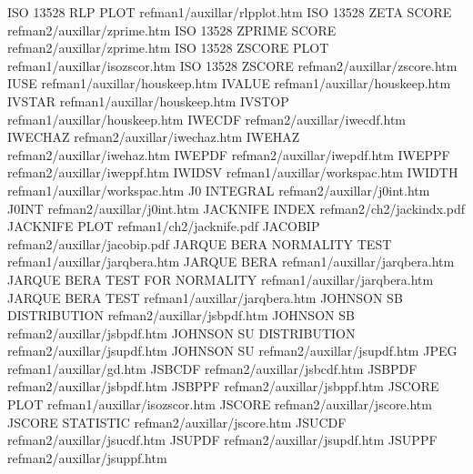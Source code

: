 ISO 13528 RLP PLOT                      refman1/auxillar/rlpplot.htm
ISO 13528 ZETA SCORE                    refman2/auxillar/zprime.htm
ISO 13528 ZPRIME SCORE                  refman2/auxillar/zprime.htm
ISO 13528 ZSCORE PLOT                   refman1/auxillar/isozscor.htm
ISO 13528 ZSCORE                        refman2/auxillar/zscore.htm
IUSE                                    refman1/auxillar/houskeep.htm
IVALUE                                  refman1/auxillar/houskeep.htm
IVSTAR                                  refman1/auxillar/houskeep.htm
IVSTOP                                  refman1/auxillar/houskeep.htm
IWECDF                                  refman2/auxillar/iwecdf.htm
IWECHAZ                                 refman2/auxillar/iwechaz.htm
IWEHAZ                                  refman2/auxillar/iwehaz.htm
IWEPDF                                  refman2/auxillar/iwepdf.htm
IWEPPF                                  refman2/auxillar/iweppf.htm
IWIDSV                                  refman1/auxillar/workspac.htm
IWIDTH                                  refman1/auxillar/workspac.htm
J0 INTEGRAL                             refman2/auxillar/j0int.htm
J0INT                                   refman2/auxillar/j0int.htm
JACKNIFE INDEX                          refman2/ch2/jackindx.pdf
JACKNIFE PLOT                           refman1/ch2/jacknife.pdf
JACOBIP                                 refman2/auxillar/jacobip.pdf
JARQUE BERA NORMALITY TEST              refman1/auxillar/jarqbera.htm
JARQUE BERA                             refman1/auxillar/jarqbera.htm
JARQUE BERA TEST FOR NORMALITY          refman1/auxillar/jarqbera.htm
JARQUE BERA TEST                        refman1/auxillar/jarqbera.htm
JOHNSON SB DISTRIBUTION                 refman2/auxillar/jsbpdf.htm
JOHNSON SB                              refman2/auxillar/jsbpdf.htm
JOHNSON SU DISTRIBUTION                 refman2/auxillar/jsupdf.htm
JOHNSON SU                              refman2/auxillar/jsupdf.htm
JPEG                                    refman1/auxillar/gd.htm
JSBCDF                                  refman2/auxillar/jsbcdf.htm
JSBPDF                                  refman2/auxillar/jsbpdf.htm
JSBPPF                                  refman2/auxillar/jsbppf.htm
JSCORE PLOT                             refman1/auxillar/isozscor.htm
JSCORE                                  refman2/auxillar/jscore.htm
JSCORE STATISTIC                        refman2/auxillar/jscore.htm
JSUCDF                                  refman2/auxillar/jsucdf.htm
JSUPDF                                  refman2/auxillar/jsupdf.htm
JSUPPF                                  refman2/auxillar/jsuppf.htm
